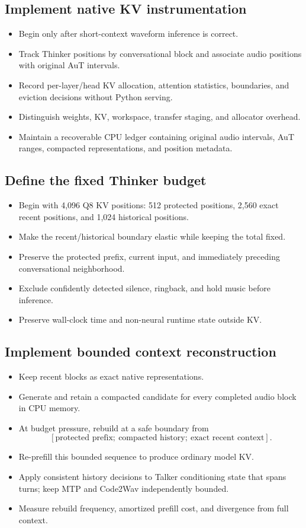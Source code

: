 \documentclass[10pt,letterpaper]{article}
\begin{document}
\subsection{Implement native KV instrumentation}
\begin{itemize}
    \item Begin only after short-context waveform inference is correct.
    \item Track Thinker positions by conversational block and associate audio positions with original AuT intervals.
    \item Record per-layer/head KV allocation, attention statistics, boundaries, and eviction decisions without Python serving.
    \item Distinguish weights, KV, workspace, transfer staging, and allocator overhead.
    \item Maintain a recoverable CPU ledger containing original audio intervals, AuT ranges, compacted representations, and position metadata.
\end{itemize}

\subsection{Define the fixed Thinker budget}
\begin{itemize}
    \item Begin with 4,096 Q8 KV positions: 512 protected positions, 2,560 exact recent positions, and 1,024 historical positions.
    \item Make the recent/historical boundary elastic while keeping the total fixed.
    \item Preserve the protected prefix, current input, and immediately preceding conversational neighborhood.
    \item Exclude confidently detected silence, ringback, and hold music before inference.
    \item Preserve wall-clock time and non-neural runtime state outside KV.
\end{itemize}

\subsection{Implement bounded context reconstruction}
\begin{itemize}
    \item Keep recent blocks as exact native representations.
    \item Generate and retain a compacted candidate for every completed audio block in CPU memory.
    \item At budget pressure, rebuild at a safe boundary from
    \[
    [\text{protected prefix};\ \text{compacted history};\ \text{exact recent context}].
    \]
    \item Re-prefill this bounded sequence to produce ordinary model KV.
    \item Apply consistent history decisions to Talker conditioning state that spans turns; keep MTP and Code2Wav independently bounded.
    \item Measure rebuild frequency, amortized prefill cost, and divergence from full context.
\end{itemize}
\end{document}
